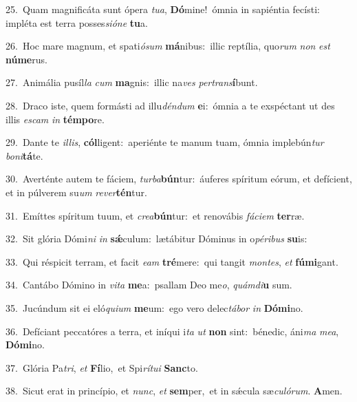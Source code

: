 {\numbfont\textcolor{\numbcolor}{25.}}~Quam magnificáta sunt ópera \textit{tu}\-\textit{a}, \textbf{Dó}\-mine!~\star ómnia in sapiéntia fecísti: impléta est terra posses\-\textit{si}\-\textit{ó}\textit{ne} \textbf{tu}\-a.\par
{\numbfont\textcolor{\numbcolor}{26.}}~Hoc mare magnum, et spati\-\textit{ó}\-\textit{sum} \textbf{má}\-nibus:~\star illic reptília, quo\textit{rum} \textit{non} \textit{est} \textbf{nú}\-\textbf{me}rus.\par
{\numbfont\textcolor{\numbcolor}{27.}}~Animália pusíl\textit{la} \textit{cum} \textbf{ma}\-gnis:~\star illic na\textit{ves} \textit{per}\-\textit{trans}\textbf{í}bunt.\par
{\numbfont\textcolor{\numbcolor}{28.}}~Draco iste, quem formásti ad illu\-\textit{dén}\-\textit{dum} \textbf{e}\-i:~\star ómnia a te exspéctant ut des illis \textit{es}\-\textit{cam} \textit{in} \textbf{tém}\-\textbf{po}re.\par
{\numbfont\textcolor{\numbcolor}{29.}}~Dante te \textit{il}\-\textit{lis}, \textbf{cól}\-ligent:~\star aperiénte te manum tuam, ómnia implebún\textit{tur} \textit{bo}\-\textit{ni}\textbf{tá}te.\par
{\numbfont\textcolor{\numbcolor}{30.}}~Averténte autem te fáciem, \textit{tur}\-\textit{ba}\textbf{bún}tur:~\star áuferes spíritum eórum, et defícient, et in púlverem su\textit{um} \textit{re}\-\textit{ver}\textbf{tén}tur.\par
{\numbfont\textcolor{\numbcolor}{31.}}~Emíttes spíritum tuum, et \textit{cre}\-\textit{a}\textbf{bún}tur:~\star et renovábis \textit{fá}\-\textit{ci}\textit{em} \textbf{ter}\-ræ.\par
{\numbfont\textcolor{\numbcolor}{32.}}~Sit glória Dómi\textit{ni} \textit{in} \textbf{sǽ}\-culum:~\star lætábitur Dóminus in o\-\textit{pé}\-\textit{ri}\textit{bus} \textbf{su}\-is:\par
{\numbfont\textcolor{\numbcolor}{33.}}~Qui réspicit terram, et facit \textit{e}\-\textit{am} \textbf{tré}\-mere:~\star qui tangit \textit{mon}\-\textit{tes}, \textit{et} \textbf{fú}\-\textbf{mi}gant.\par
{\numbfont\textcolor{\numbcolor}{34.}}~Cantábo Dómino in \textit{vi}\-\textit{ta} \textbf{me}\-a:~\star psallam Deo me\-\textit{o}\-, \textit{quám}\-\textit{di}\textbf{u} sum.\par
{\numbfont\textcolor{\numbcolor}{35.}}~Jucúndum sit ei eló\-\textit{qui}\-\textit{um} \textbf{me}\-um:~\star ego vero delec\-\textit{tá}\-\textit{bor} \textit{in} \textbf{Dó}\-\textbf{mi}no.\par
{\numbfont\textcolor{\numbcolor}{36.}}~Defíciant peccatóres a terra, et iníqui i\textit{ta} \textit{ut} \textbf{non} sint:~\star bénedic, áni\textit{ma} \textit{me}\-\textit{a}, \textbf{Dó}\-\textbf{mi}no.\par
{\numbfont\textcolor{\numbcolor}{37.}}~Glória Pa\-\textit{tri}\-, \textit{et} \textbf{Fí}\-lio,~\star et Spi\-\textit{rí}\-\textit{tu}\textit{i} \textbf{Sanc}\-to.\par
{\numbfont\textcolor{\numbcolor}{38.}}~Sicut erat in princípio, et \textit{nunc}\-, \textit{et} \textbf{sem}\-per,~\star et in sǽcula sæ\-\textit{cu}\-\textit{ló}\textit{rum}. \textbf{A}\-men.\par
